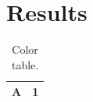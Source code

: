 \documentclass{article}
\begin{document}
\section{Results}
\begin{table}
\centering
\caption{Color table.}
\label{tab:color}
\begin{tabular}{lc}
\toprule
\rowcolor{myblue} A & 1 \\
\bottomrule
\end{tabular}
\end{table}
\end{document}
